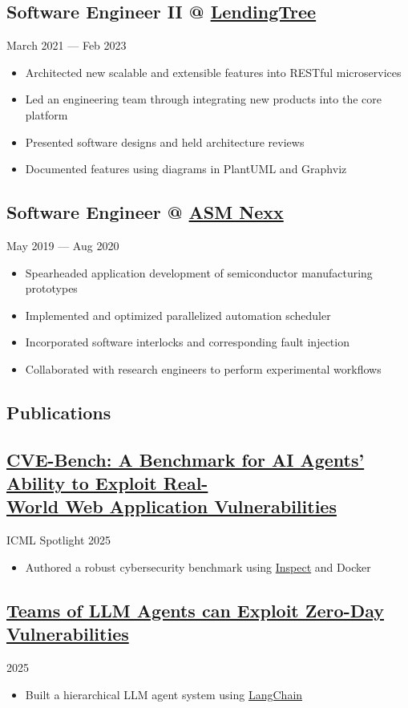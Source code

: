 \documentclass[11pt, letterpaper]{article}
\newcommand{\datedsubsection}[2]{
    \titleformat{\subsection}[runin]{\normalfont\normalsize\bfseries}{\thesection}{}{}
    \subsection*{#1}
    \hfill#2
    \titleformat{\subsection}[hang]{\normalfont\normalsize\bfseries}{\thesection}{}{}
}
\begin{document}
\datedsubsection{Software Engineer II @ \href{https://www.crunchbase.com/organization/lendingtree}{LendingTree}}{March 2021 --- Feb 2023}
\begin{itemize}
    \item Architected new scalable and extensible features into RESTful microservices
    \item Led an engineering team through integrating new products into the core platform
    \item Presented software designs and held architecture reviews
    \item Documented features using diagrams in PlantUML and Graphviz
\end{itemize}

\datedsubsection{Software Engineer @ \href{https://www.crunchbase.com/organization/asm-nexx}{ASM Nexx}}{May 2019 --- Aug 2020}
\begin{itemize}
    \item Spearheaded application development of semiconductor manufacturing prototypes
    \item Implemented and optimized parallelized automation scheduler
    \item Incorporated software interlocks and corresponding fault injection
    \item Collaborated with research engineers to perform experimental workflows
\end{itemize}

\textcolor{header}{\section*{Publications}}\label{sec:publications}

\datedsubsection{\href{https://arxiv.org/abs/2503.17332}{CVE-Bench: A Benchmark for AI Agents' Ability to Exploit Real-\\ World Web Application Vulnerabilities}}{ICML Spotlight 2025}
\begin{itemize}
    \item Authored a robust cybersecurity benchmark using \href{https://inspect.aisi.org.uk/}{Inspect} and Docker
\end{itemize}

\datedsubsection{\href{https://arxiv.org/abs/2406.01637}{Teams of LLM Agents can Exploit Zero-Day Vulnerabilities}}{2025}
\begin{itemize}
    \item Built a hierarchical LLM agent system using \href{https://www.langchain.com/}{LangChain}
\end{itemize}
\end{document}
